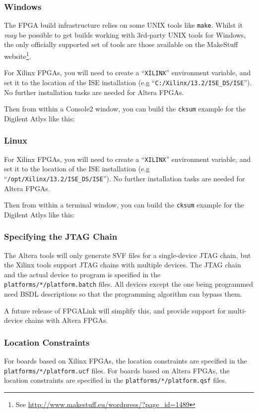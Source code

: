 \subsubsection{Windows}
The FPGA build infrastructure relies on some UNIX tools like \texttt{make}. Whilst it \textit{may} be possible to get builds working with 3rd-party UNIX tools for Windows, the only officially supported set of tools are those available on the MakeStuff website\footnote{See \url{http://www.makestuff.eu/wordpress/?page_id=1489}}.

For Xilinx FPGAs, you will need to create a ``\texttt{XILINX}'' environment variable, and set it to the location of the ISE installation (e.g ``\texttt{C:/Xilinx/13.2/ISE\_DS/ISE}''). No further installation tasks are needed for Altera FPGAs.

\newpage
Then from within a Console2 window, you can build the \texttt{cksum} example for the Digilent Atlys like this:


\subsubsection{Linux}
For Xilinx FPGAs, you will need to create a ``\texttt{XILINX}'' environment variable, and set it to the location of the ISE installation (e.g ``\texttt{/opt/Xilinx/13.2/ISE\_DS/ISE}''). No further installation tasks are needed for Altera FPGAs.

Then from within a terminal window, you can build the \texttt{cksum} example for the Digilent Atlys like this:


\subsubsection{Specifying the JTAG Chain}
The Altera tools will only generate SVF files for a single-device JTAG chain, but the Xilinx tools support JTAG chains with multiple devices. The JTAG chain and the actual device to program is specified in the \texttt{platforms/*/platform.batch} files. All devices except the one being programmed need BSDL descriptions so that the programming algorithm can bypass them.

A future release of FPGALink will simplify this, and provide support for multi-device chains with Altera FPGAs.

\subsubsection{Location Constraints}
For boards based on Xilinx FPGAs, the location constraints are specified in the \texttt{platforms/*/platform.ucf} files. For boards based on Altera FPGAs, the location constraints are specified in the \texttt{platforms/*/platform.qsf} files.


